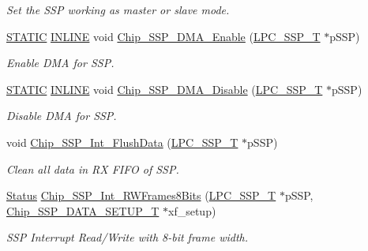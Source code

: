 \begin{DoxyCompactItemize}
\begin{DoxyCompactList}\small\item\em Set the S\+SP working as master or slave mode. \end{DoxyCompactList}\item 
\hyperlink{group___l_p_c___types___public___macros_ga10b2d890d871e1489bb02b7e70d9bdfb}{S\+T\+A\+T\+IC} \hyperlink{spifi__18xx__43xx_8h_a2eb6f9e0395b47b8d5e3eeae4fe0c116}{I\+N\+L\+I\+NE} void \hyperlink{group___s_s_p__18_x_x__43_x_x_gae8bf34541c093c052e5f9baf41fcda8b}{Chip\+\_\+\+S\+S\+P\+\_\+\+D\+M\+A\+\_\+\+Enable} (\hyperlink{struct_l_p_c___s_s_p___t}{L\+P\+C\+\_\+\+S\+S\+P\+\_\+T} $\ast$p\+S\+SP)
\begin{DoxyCompactList}\small\item\em Enable D\+MA for S\+SP. \end{DoxyCompactList}\item 
\hyperlink{group___l_p_c___types___public___macros_ga10b2d890d871e1489bb02b7e70d9bdfb}{S\+T\+A\+T\+IC} \hyperlink{spifi__18xx__43xx_8h_a2eb6f9e0395b47b8d5e3eeae4fe0c116}{I\+N\+L\+I\+NE} void \hyperlink{group___s_s_p__18_x_x__43_x_x_gaa8c7ce019dfcc4ab5731615f66c30e19}{Chip\+\_\+\+S\+S\+P\+\_\+\+D\+M\+A\+\_\+\+Disable} (\hyperlink{struct_l_p_c___s_s_p___t}{L\+P\+C\+\_\+\+S\+S\+P\+\_\+T} $\ast$p\+S\+SP)
\begin{DoxyCompactList}\small\item\em Disable D\+MA for S\+SP. \end{DoxyCompactList}\item 
void \hyperlink{group___s_s_p__18_x_x__43_x_x_gabf29dfba7478866abe7511d32638e57e}{Chip\+\_\+\+S\+S\+P\+\_\+\+Int\+\_\+\+Flush\+Data} (\hyperlink{struct_l_p_c___s_s_p___t}{L\+P\+C\+\_\+\+S\+S\+P\+\_\+T} $\ast$p\+S\+SP)
\begin{DoxyCompactList}\small\item\em Clean all data in RX F\+I\+FO of S\+SP. \end{DoxyCompactList}\item 
\hyperlink{group___l_p_c___types___public___types_ga67a0db04d321a74b7e7fcfd3f1a3f70b}{Status} \hyperlink{group___s_s_p__18_x_x__43_x_x_ga23d901d1757b6d95efc20c4d76721fb3}{Chip\+\_\+\+S\+S\+P\+\_\+\+Int\+\_\+\+R\+W\+Frames8\+Bits} (\hyperlink{struct_l_p_c___s_s_p___t}{L\+P\+C\+\_\+\+S\+S\+P\+\_\+T} $\ast$p\+S\+SP, \hyperlink{struct_chip___s_s_p___d_a_t_a___s_e_t_u_p___t}{Chip\+\_\+\+S\+S\+P\+\_\+\+D\+A\+T\+A\+\_\+\+S\+E\+T\+U\+P\+\_\+T} $\ast$xf\+\_\+setup)
\begin{DoxyCompactList}\small\item\em S\+SP Interrupt Read/\+Write with 8-\/bit frame width. \end{DoxyCompactList}\item 

\end{DoxyCompactItemize}
